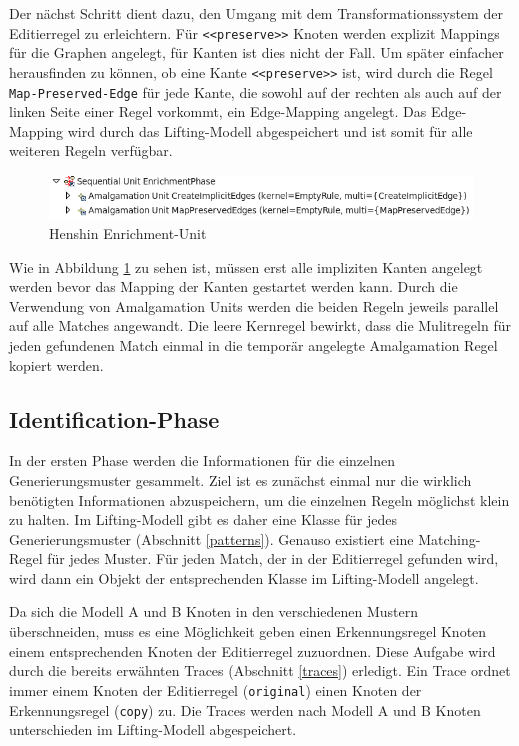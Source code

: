 Der nächst Schritt dient dazu, den Umgang mit dem Transformationssystem  der Editierregel  zu
erleichtern. Für \texttt{<<preserve>>}  Knoten werden explizit Mappings für die Graphen angelegt,
für Kanten ist dies nicht der Fall. Um später einfacher herausfinden zu können, ob eine Kante
\texttt{<<preserve>>} ist, wird durch die Regel \texttt{Map-Preserved-Edge} für jede Kante, die
sowohl auf der rechten als auch auf der linken Seite einer Regel vorkommt, ein Edge-Mapping
angelegt. Das Edge-Mapping wird durch das Lifting-Modell abgespeichert und ist somit für alle
weiteren Regeln verfügbar.

\begin{figure}[h!]
  \centering
  \includegraphics[scale=0.8]{images/hot_enrichment_unit.png}
  \caption{Henshin Enrichment-Unit}
  \label{fig:hot_enrichment_unit}
\end{figure}

Wie in Abbildung \ref{fig:hot_enrichment_unit} zu sehen ist, müssen erst alle impliziten Kanten
angelegt werden bevor das Mapping der Kanten gestartet werden kann. Durch die Verwendung von
Amalgamation Units werden die beiden Regeln  jeweils parallel auf alle Matches angewandt. Die
leere Kernregel bewirkt, dass die Mulitregeln für jeden gefundenen Match einmal in die temporär
angelegte Amalgamation Regel kopiert werden.

\subsection{Identification-Phase} 

In der ersten Phase werden die Informationen für die einzelnen Generierungsmuster gesammelt. Ziel
ist es zunächst einmal nur die wirklich benötigten Informationen abzuspeichern, um die einzelnen
Regeln möglichst klein zu halten. Im Lifting-Modell gibt es daher eine Klasse für jedes
Generierungsmuster (Abschnitt \ref{patterns}). Genauso existiert eine Matching-Regel für jedes
Muster. Für jeden Match, der in der Editierregel gefunden wird, wird dann ein Objekt der
entsprechenden Klasse im Lifting-Modell angelegt.

Da sich die Modell A und B Knoten in den verschiedenen Mustern überschneiden, muss es eine
Möglichkeit geben einen Erkennungsregel Knoten einem entsprechenden Knoten der Editierregel
zuzuordnen. Diese Aufgabe wird durch die bereits erwähnten Traces (Abschnitt \ref{traces}) erledigt. Ein
Trace ordnet immer einem Knoten der Editierregel (\texttt{original}) einen Knoten der Erkennungsregel (\texttt{copy})
zu. Die Traces werden nach Modell A und B Knoten unterschieden im Lifting-Modell abgespeichert.


